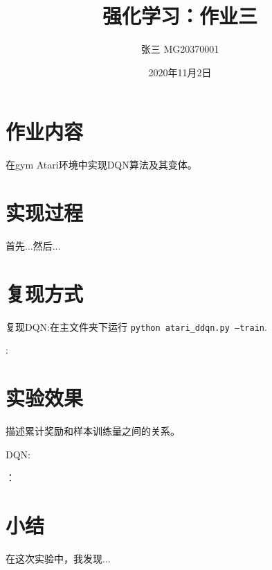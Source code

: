 \documentclass[a4paper,12pt]{article}
\begin{document}
\begin{CJK}{UTF8}{gbsn}

\title{强化学习：作业三}

\author{张三 MG20370001}

\date{2020年11月2日}

\maketitle

\section{作业内容}
在gym Atari环境中实现DQN算法及其变体。

\section{实现过程}

首先...然后...

\section{复现方式}
复现DQN:在主文件夹下运行 \texttt{python atari\_ddqn.py --train}.

:
\section{实验效果}
描述累计奖励和样本训练量之间的关系。

\noindent DQN:

：

\section{小结}
在这次实验中，我发现...



\end{CJK}
\end{document}
